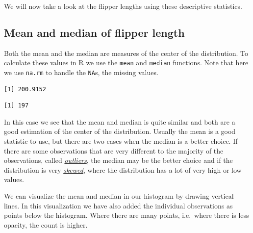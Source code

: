 \documentclass[
  letterpaper,
  DIV=11,
  numbers=noendperiod]{scrreprt}
\newenvironment{Shaded}{\begin{snugshade}}{\end{snugshade}}
\newcommand{\AttributeTok}[1]{\textcolor[rgb]{0.40,0.45,0.13}{#1}}
\newcommand{\CommentTok}[1]{\textcolor[rgb]{0.37,0.37,0.37}{#1}}
\newcommand{\ConstantTok}[1]{\textcolor[rgb]{0.56,0.35,0.01}{#1}}
\newcommand{\FunctionTok}[1]{\textcolor[rgb]{0.28,0.35,0.67}{#1}}
\newcommand{\NormalTok}[1]{\textcolor[rgb]{0.00,0.23,0.31}{#1}}
\newcommand{\SpecialCharTok}[1]{\textcolor[rgb]{0.37,0.37,0.37}{#1}}
\begin{document}
We will now take a look at the flipper lengths using these descriptive
statistics.

\subsection{Mean and median of flipper
length}\label{mean-and-median-of-flipper-length}

Both the mean and the median are measures of the center of the
distribution. To calculate these values in R we use the \texttt{mean}
and \texttt{median} functions. Note that here we use \texttt{na.rm} to
handle the \texttt{NA}s, the missing values.

\begin{Shaded}
\end{Shaded}

\begin{verbatim}
[1] 200.9152
\end{verbatim}

\begin{Shaded}
\end{Shaded}

\begin{verbatim}
[1] 197
\end{verbatim}

In this case we see that the mean and median is quite similar and both
are a good estimation of the center of the distribution. Usually the
mean is a good statistic to use, but there are two cases when the median
is a better choice. If there are some observations that are very
different to the majority of the observations, called
\href{https://en.wikipedia.org/wiki/Outlier}{\emph{outliers}}, the
median may be the better choice and if the distribution is very
\href{https://en.wikipedia.org/wiki/Skewness}{\emph{skewed}}, where the
distribution has a lot of very high or low values.

We can visualize the {mean} and {median} in our histogram by drawing
vertical lines. In this visualization we have also added the individual
observations as points below the histogram. Where there are many points,
i.e.~where there is less opacity, the count is higher.
\end{document}
